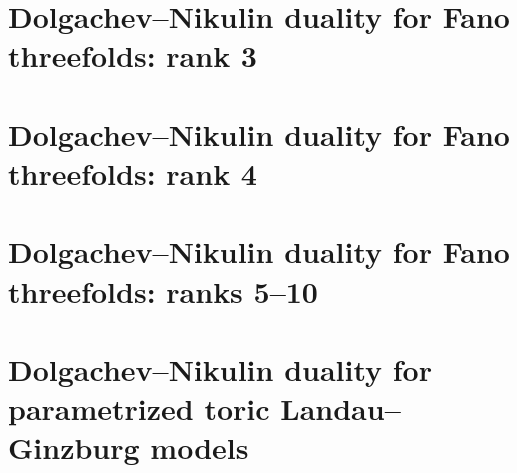 \documentclass[10pt]{amsart}
\numberwithin{equation}{section}
\theoremstyle{plain}
\theoremstyle{definition}
\theoremstyle{remark}
\begin{document}
\section{Dolgachev--Nikulin duality for Fano threefolds: rank 3}\label{appendix:rank-03}
































\section{Dolgachev--Nikulin duality for Fano threefolds: rank 4}\label{appendix:rank-04}














\section{Dolgachev--Nikulin duality for Fano threefolds: ranks 5--10}\label{appendix:higher-ranks}









\section{Dolgachev--Nikulin duality for parametrized toric Landau--Ginzburg models}
\label{appendix:parametrized}











\printbibliography
\end{document}
